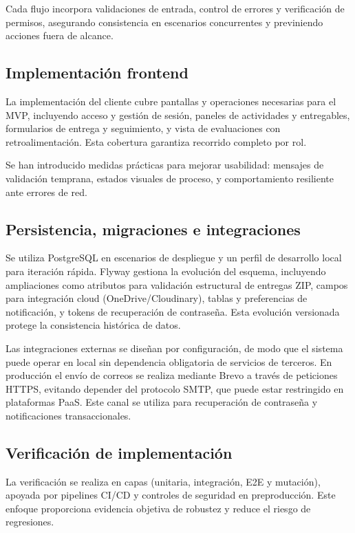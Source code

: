 Cada flujo incorpora validaciones de entrada, control de errores y verificaci\'on de permisos,
asegurando consistencia en escenarios concurrentes y previniendo acciones fuera de alcance.

\subsection{Implementaci\'on frontend}

La implementaci\'on del cliente cubre pantallas y operaciones necesarias para el MVP, incluyendo acceso y gesti\'on de sesi\'on, paneles de actividades y entregables, formularios de entrega y seguimiento, y vista de evaluaciones con retroalimentaci\'on. Esta cobertura garantiza recorrido completo por rol.

Se han introducido medidas pr\'acticas para mejorar usabilidad:
mensajes de validaci\'on temprana, estados visuales de proceso,
y comportamiento resiliente ante errores de red.

\subsection{Persistencia, migraciones e integraciones}

Se utiliza PostgreSQL en escenarios de despliegue y un perfil de desarrollo
local para iteraci\'on r\'apida. Flyway gestiona la evoluci\'on del esquema, incluyendo ampliaciones como atributos para validaci\'on estructural de entregas ZIP, campos para integraci\'on cloud (OneDrive/Cloudinary), tablas y preferencias de notificaci\'on, y tokens de recuperaci\'on de contrase\~na. Esta evoluci\'on versionada protege la consistencia hist\'orica de datos.

Las integraciones externas se dise\~nan por configuraci\'on,
de modo que el sistema puede operar en local sin dependencia obligatoria
de servicios de terceros.
En producci\'on el env\'io de correos se realiza mediante Brevo a trav\'es
de peticiones HTTPS, evitando depender del protocolo SMTP, que puede estar
restringido en plataformas PaaS. Este canal se utiliza para recuperaci\'on
de contrase\~na y notificaciones transaccionales.

\subsection{Verificaci\'on de implementaci\'on}

La verificaci\'on se realiza en capas (unitaria, integraci\'on, E2E y mutaci\'on),
apoyada por pipelines CI/CD y controles de seguridad en preproducci\'on.
Este enfoque proporciona evidencia objetiva de robustez y reduce el riesgo de regresiones.

